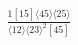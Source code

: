\documentclass[varwidth, border=5pt]{standalone}
\begin{document}
\begin{my}
$\begin{gathered}
\scriptscriptstyle\frac{1[15]⟨45⟩⟨25⟩}{⟨12⟩⟨23⟩^2[45]}
\end{gathered}$
\end{my}
\end{document}
